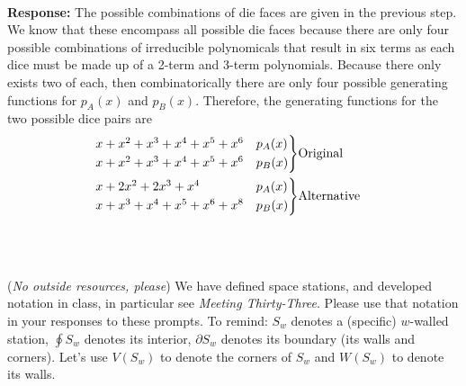 \documentclass{article}
\newcommand{\response}[1]{\leavevmode\\[0.05in]{\bf Response: } #1 \leavevmode\\[0.05in]}
\begin{document}
\response{The possible combinations of die faces are given in the previous step.  We know that these encompass all possible die faces because there are only four possible combinations of irreducible polynomicals that result in six terms as each dice must be made up of a 2-term and 3-term polynomials. Because there only exists two of each, then combinatorically there are only four possible generating functions for $p_A(x)$ and $p_B(x)$. Therefore, the generating functions for the two possible dice pairs are 
\begin{equation*}\begin{aligned}
	\begin{rcases}
		x + x^2 + x^3 + x^4 + x^5 + x^6 & p_A(x) \\
		x + x^2 + x^3 + x^4 + x^5 + x^6 & p_B(x) \\ 
	\end{rcases} & \text{Original} \\ 
	\begin{rcases}
		x + 2x^2 + 2x^3 + x^4 & p_A(x)\\
		x + x^3 + x^4 + x^5 + x^6 + x^8 & p_B(x) \\
	\end{rcases} & \text{Alternative} \\
\end{aligned}\end{equation*}
}
\noindent \underline{\hspace{5in}}\\[2em]
\\
\noindent(\emph{No outside resources, please}) We have defined space stations, and developed notation in class, in particular see \emph{Meeting Thirty-Three}.  Please use that notation in your responses to these prompts.  To remind: $S_w$ denotes a (specific) $w$-walled station, $\oint S_w$ denotes its interior, $\partial S_w$ denotes its boundary (its walls and corners).  Let's use $V(S_w)$ to denote the corners of $S_w$ and $W(S_w)$ to denote its walls.\\
\end{document}
